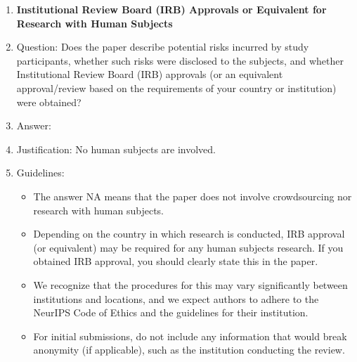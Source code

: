 \documentclass{article}
\begin{document}
\begin{enumerate}
\item {\bf Institutional Review Board (IRB) Approvals or Equivalent for Research with Human Subjects}
    \item[] Question: Does the paper describe potential risks incurred by study participants, whether such risks were disclosed to the subjects, and whether Institutional Review Board (IRB) approvals (or an equivalent approval/review based on the requirements of your country or institution) were obtained?
    \item[] Answer: \answerNA{} %
    \item[] Justification: No human subjects are involved.
    \item[] Guidelines:
    \begin{itemize}
        \item The answer NA means that the paper does not involve crowdsourcing nor research with human subjects.
        \item Depending on the country in which research is conducted, IRB approval (or equivalent) may be required for any human subjects research. If you obtained IRB approval, you should clearly state this in the paper. 
        \item We recognize that the procedures for this may vary significantly between institutions and locations, and we expect authors to adhere to the NeurIPS Code of Ethics and the guidelines for their institution. 
        \item For initial submissions, do not include any information that would break anonymity (if applicable), such as the institution conducting the review.
    \end{itemize}

\end{enumerate}
\end{document}
